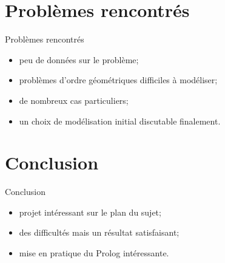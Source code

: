 \documentclass{beamer}
\begin{document}
	\section{Problèmes rencontrés}
	
\begin{frame}{Problèmes rencontrés}

	\begin{itemize}
		\item peu de données sur le problème;
		\item problèmes d'ordre géométriques difficiles à modéliser;
		\item de nombreux cas particuliers;
		\item un choix de modélisation initial discutable finalement.
	\end{itemize}

\end{frame}


	\section{Conclusion}
	
\begin{frame}{Conclusion}

	\begin{itemize}
		\item projet intéressant sur le plan du sujet;
		\item des difficultés mais un résultat satisfaisant;
		\item mise en pratique du Prolog intéressante.
	\end{itemize}

\end{frame}
	
\end{document}
